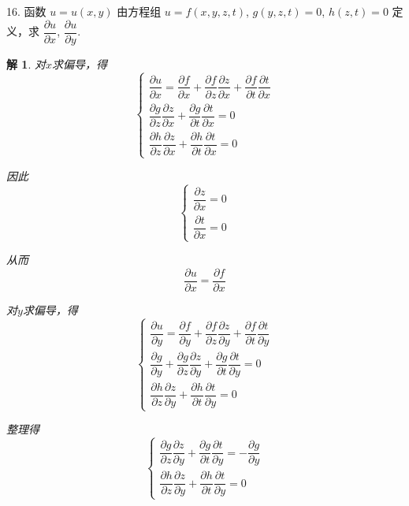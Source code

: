 \documentclass[a4paper,12pt]{article}
\newtheorem*{sol}{解}
\begin{document}
16. 函数 $u = u(x,y)$ 由方程组 $u = f(x,y,z,t)$, $g(y,z,t) = 0$, $h(z,t) = 0$ 定义，求 $\dfrac{\partial u}{\partial x}$, $\dfrac{\partial u}{\partial y}$.
\begin{sol}
    对$x$求偏导，得
    $$\begin{cases}
            \dfrac{\partial u}{\partial x} = \dfrac{\partial f}{\partial x} + \dfrac{\partial f}{\partial z}\dfrac{\partial z}{\partial x} + \dfrac{\partial f}{\partial t}\dfrac{\partial t}{\partial x} \\
            \dfrac{\partial g}{\partial z}\dfrac{\partial z}{\partial x} + \dfrac{\partial g}{\partial t}\dfrac{\partial t}{\partial x} = 0                                                               \\
            \dfrac{\partial h}{\partial z}\dfrac{\partial z}{\partial x} + \dfrac{\partial h}{\partial t}\dfrac{\partial t}{\partial x} = 0
        \end{cases}$$

    因此
    $$\begin{cases}
            \dfrac{\partial z}{\partial x} = 0 \\
            \dfrac{\partial t}{\partial x} = 0
        \end{cases}$$

    从而
    $$\dfrac{\partial u}{\partial x} = \dfrac{\partial f}{\partial x}$$

    对$y$求偏导，得
    $$\begin{cases}
            \dfrac{\partial u}{\partial y} = \dfrac{\partial f}{\partial y} + \dfrac{\partial f}{\partial z}\dfrac{\partial z}{\partial y} + \dfrac{\partial f}{\partial t}\dfrac{\partial t}{\partial y} \\
            \dfrac{\partial g}{\partial y} + \dfrac{\partial g}{\partial z}\dfrac{\partial z}{\partial y} + \dfrac{\partial g}{\partial t}\dfrac{\partial t}{\partial y} = 0                              \\
            \dfrac{\partial h}{\partial z}\dfrac{\partial z}{\partial y} + \dfrac{\partial h}{\partial t}\dfrac{\partial t}{\partial y} = 0
        \end{cases}$$

    整理得
    $$\begin{cases}
            \dfrac{\partial g}{\partial z}\dfrac{\partial z}{\partial y} + \dfrac{\partial g}{\partial t}\dfrac{\partial t}{\partial y} = -\dfrac{\partial g}{\partial y} \\
            \dfrac{\partial h}{\partial z}\dfrac{\partial z}{\partial y} + \dfrac{\partial h}{\partial t}\dfrac{\partial t}{\partial y} = 0
        \end{cases}$$


\end{sol}
\end{document}
